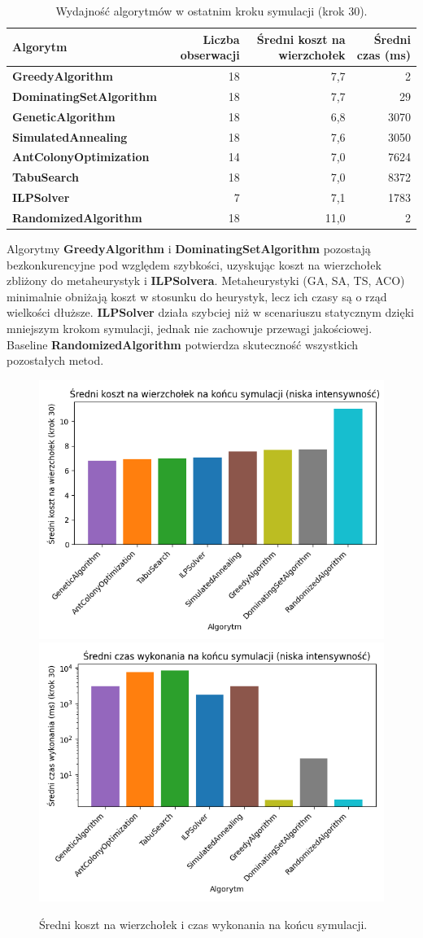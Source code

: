 \begin{table}[H]
\centering
\begin{tabular}{|l|r|r|r|}
\hline
\textbf{Algorytm} & \textbf{Liczba obserwacji} & \textbf{Średni koszt na wierzchołek} & \textbf{Średni czas (ms)} \\
\hline
\textbf{GreedyAlgorithm} & 18 & 7,7 & 2 \\
\textbf{DominatingSetAlgorithm} & 18 & 7,7 & 29 \\
\textbf{GeneticAlgorithm} & 18 & 6,8 & 3070 \\
\textbf{SimulatedAnnealing} & 18 & 7,6 & 3050 \\
\textbf{AntColonyOptimization} & 14 & 7,0 & 7624 \\
\textbf{TabuSearch} & 18 & 7,0 & 8372 \\
\textbf{ILPSolver} & 7 & 7,1 & 1783 \\
\textbf{RandomizedAlgorithm} & 18 & 11,0 & 2 \\
\hline
\end{tabular}
\caption{Wydajność algorytmów w ostatnim kroku symulacji (krok 30).}
\label{tab:dynamic_final_step}
\end{table}

Algorytmy \textbf{GreedyAlgorithm} i \textbf{DominatingSetAlgorithm} pozostają bezkonkurencyjne pod względem szybkości, uzyskując koszt na wierzchołek zbliżony do metaheurystyk i \textbf{ILPSolvera}. Metaheurystyki (GA, SA, TS, ACO) minimalnie obniżają koszt w stosunku do heurystyk, lecz ich czasy są o rząd wielkości dłuższe. \textbf{ILPSolver} działa szybciej niż w scenariuszu statycznym dzięki mniejszym krokom symulacji, jednak nie zachowuje przewagi jakościowej. Baseline \textbf{RandomizedAlgorithm} potwierdza skuteczność wszystkich pozostałych metod.

\begin{figure}[H]
  \centering
  \includegraphics[width=0.48\linewidth]{assets/figures/final_step_cost.png}
  \includegraphics[width=0.48\linewidth]{assets/figures/final_step_time.png}
  \caption{Średni koszt na wierzchołek i czas wykonania na końcu symulacji.}
  \label{fig:dynamic_final_bars}
\end{figure}

